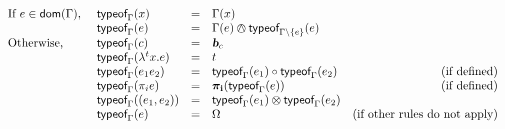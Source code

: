 \documentclass[a4paper]{article}
\theoremstyle{definition}
\begin{document}
    \begin{align*}
      \begin{array}{llclr}
      \text{If } e \in \dom \Gamma \text{, } & \tyof x \Gamma &=& \Gamma(x)\\
      & \tyof e \Gamma &=& \Gamma(e) \tsand \tyof e {\Gamma\setminus\{e\}}\\
      \text{Otherwise,} & \tyof c \Gamma &=& \basic{c}\\
      &\tyof {\lambda^{t}x.e} \Gamma &=& t\\
      &\tyof {{e_1} {e_2}} \Gamma &=& \apply {\tyof {e_1} \Gamma} {\tyof {e_2} \Gamma} & \text{(if defined)}\\
      &\tyof {\pi_i e} \Gamma &=& \bpi_{\mathbf{i}}(\tyof e \Gamma) & \text{(if defined)}\\
      &\tyof {(e_1,e_2)} \Gamma &=& \tyof {e_1} \Gamma \tstimes \tyof {e_2} \Gamma\\%
      &\tyof {e} \Gamma &=& \tsempty & \text{(if other rules do not apply)}
    \end{array}
    \end{align*}

  
\end{document}

